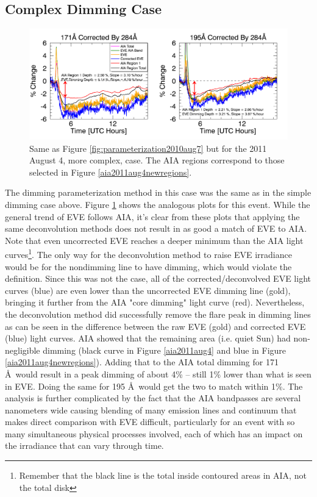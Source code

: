 \subsection{Complex Dimming Case}

\begin{figure}[!h]
    \begin{center}
	    \includegraphics[width=166mm]{Images/EveCorrectionResults2011Aug4.png}
    \end{center}
    \caption[Dimming parameterization for 2011 August 4 event]{
        Same as Figure \ref{fig:parameterization2010aug7} but for the 2011 August 4, more complex, case. The AIA regions
        correspond to those selected in Figure \ref{aia2011aug4newregions}. 
   	}
    \label{fig:parameterization2011aug4}
\end{figure}

The dimming parameterization method in this case was the same as in the simple dimming case above. Figure \ref{fig:parameterization2011aug4} shows the analogous plots for this event. While the general trend of EVE follows AIA, it's clear from these plots that applying the same deconvolution methods does not result in as good a match of EVE to AIA. Note that even uncorrected EVE reaches a deeper minimum than the AIA light curves\footnote{Remember that the black line is the total inside contoured areas in AIA, not the total disk}. The only way for the deconvolution method to raise EVE irradiance would be for the nondimming line to have dimming, which would violate the definition. Since this was not the case, all of the corrected/deconvolved EVE light curves (blue) are even lower than the uncorrected EVE dimming line (gold), bringing it further from the AIA "core dimming" light curve (red). Nevertheless, the deconvolution method did successfully remove the flare peak in dimming lines as can be seen in the difference between the raw EVE (gold) and corrected EVE (blue) light curves. AIA showed that the remaining area (i.e. quiet Sun) had non-negligible dimming (black curve in Figure \ref{aia2011aug4} and blue in Figure \ref{aia2011aug4newregions}). Adding that to the AIA total dimming for 171 \AA\ would result in a peak dimming of about 4\% -- still 1\% lower than what is seen in EVE. Doing the same for 195 \AA\ would get the two to match within 1\%. The analysis is further complicated by the fact that the AIA bandpasses are several nanometers wide causing blending of many emission lines and continuum that makes direct comparison with EVE difficult, particularly for an event with so many simultaneous physical processes involved, each of which has an impact on the irradiance that can vary through time. 


